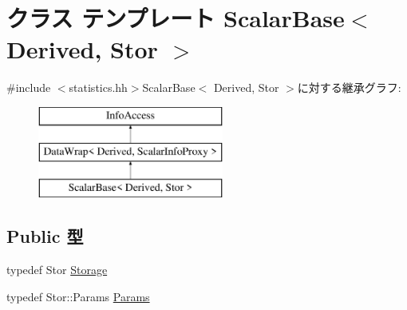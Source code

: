 \hypertarget{classStats_1_1ScalarBase}{
\section{クラス テンプレート ScalarBase$<$ Derived, Stor $>$}
\label{classStats_1_1ScalarBase}
}


{\ttfamily \#include $<$statistics.hh$>$}ScalarBase$<$ Derived, Stor $>$に対する継承グラフ:\begin{figure}[H]
\begin{center}
\leavevmode
\includegraphics[height=3cm]{classStats_1_1ScalarBase}
\end{center}
\end{figure}
\subsection*{Public 型}
\begin{DoxyCompactItemize}
\item 
typedef Stor \hyperlink{classStats_1_1ScalarBase_a5d4a6db0e7c32292f54a08d05c671bd1}{Storage}
\item 
typedef Stor::Params \hyperlink{classStats_1_1ScalarBase_a24c5f88dc162c95e0b32ade67a7ea674}{Params}
\end{DoxyCompactItemize}
